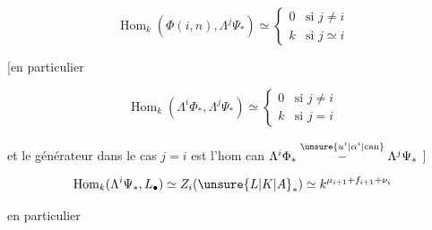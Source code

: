 \[
\operatorname{Hom}_k(\Phi(i,n),\Lambda^j\Psi_{\ast})\simeq
\begin{cases}0&\text{si }j\ne i\\k&\text{si }j\simeq i\end{cases}
\]

[en particulier

\[
\operatorname{Hom}_k(\Lambda^i\Phi_{\ast},\Lambda^j\Psi_{\ast})\simeq
\begin{cases}0&\text{si }j\ne i\\k&\text{si }j=i\end{cases}
\]

et le générateur dans le cas $j=i$ est l'hom can $\Lambda^i\Phi_{\ast}\mathrel{\overset{\unsure{u^i|\alpha^i|\mathrm{can}}}{-}}\Lambda^j\Psi_{\ast}$ ]

\[
\operatorname{Hom}_k(\Lambda^i\Psi_{\ast},L_{\bullet})\simeq Z_i(\unsure{L|K|A}_{\ast})\simeq k^{\mu_{i+1}+f_{i+1}+\nu_i}
\]

en particulier

